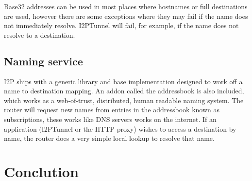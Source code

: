 \documentclass[a4paper,twocolumn,12pt]{article}
\begin{document}
Base32 addresses can be used in most places where hostnames or full
destinations are used, however there are some exceptions where they may fail if
the name does not immediately resolve. I2PTunnel will fail, for example, if the
name does not resolve to a destination.

\subsection{Naming service}

I2P ships with a generic library and base implementation designed to work off a
name to destination mapping. An addon called the addressbook is also included,
which works as a web-of-trust, distributed, human readable naming system.
The router will request new names from entries in the addressbook known as
subscriptions, these works like DNS servers works on the internet.
If an application (I2PTunnel or the HTTP\cite{http-rfc} proxy) wishes to access a destination
by name, the router does a very simple local lookup to resolve that name.


\section{Conclution}




\end{document}
